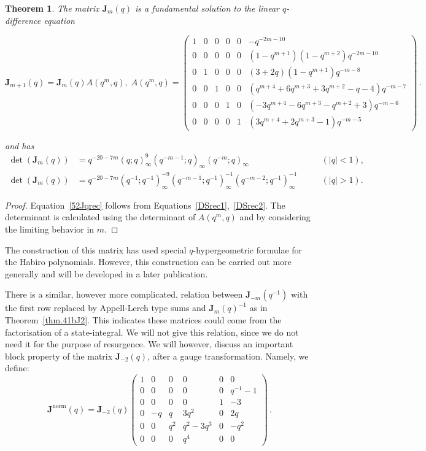 \documentclass[12pt,reqno]{amsart}
\newtheorem{theorem}{Theorem}
\theoremstyle{definition}
\def\be{\begin{equation}}
\def\ee{\end{equation}}
\def\bJ{\mathbf J}
\begin{document}
\begin{theorem}
\label{thm.51bJ1}
  The matrix $\bJ_{m}(q)$ is a fundamental solution to the linear $q$-difference
  equation
\begin{small}
\be
\label{52Jqrec}
\bJ_{m+1}(q) = \bJ_{m}(q) A(q^m,q),\; A(q^m,q)=
\begin{pmatrix}
    1 & 0 & 0 & 0 & 0 & -q^{-2m-10}\\
    0 & 0 & 0 & 0 & 0 & (1-q^{m+1})(1-q^{m+2})q^{-2m-10}\\
    0 & 1 & 0 & 0 & 0 & (3 + 2q)(1-q^{m+1})q^{-m-8}\\
    0 & 0 & 1 & 0 & 0 & (q^{m+4} + 6q^{m+3} + 3q^{m+2} - q - 4)q^{-m-7}\\
    0 & 0 & 0 & 1 & 0 & (-3q^{m+4} - 6q^{m+3} - q^{m+2} + 3)q^{-m-6}\\
    0 & 0 & 0 & 0 & 1 & (3q^{m+4} + 2q^{m+3} - 1)q^{-m-5}
  \end{pmatrix} \,.
\ee
\end{small}
and has
\be
\begin{aligned}
  \det(\bJ_{m}(q))
  &=q^{-20-7m}(q;q)_{\infty}^{9}(q^{-m-1};q)_{\infty}(q^{-m};q)_{\infty}
  &\qquad (|q|<1),\\
  \det(\bJ_{m}(q))
  &=
  q^{-20-7m}(q^{-1};q^{-1})_{\infty}^{-9}(q^{-m-1};q^{-1})_{\infty}^{-1}
  (q^{-m-2};q^{-1})_{\infty}^{-1}
  &\qquad (|q|>1).
\end{aligned}
\ee
\end{theorem}
\begin{proof}
  Equation~\eqref{52Jqrec} follows from Equations~\eqref{DSrec1},~\eqref{DSrec2}. The
  determinant is calculated using the determinant of $A(q^{m},q)$ and by considering
  the limiting behavior in $m$.
\end{proof}
The construction of this matrix has used special $q$-hypergeometric formulae for the
Habiro polynomials. However, this construction can be carried out more generally and
will be developed in a later publication. 

There is a similar, however more complicated, relation between
$\bJ_{-m}(q^{-1})$ with the first row replaced by Appell-Lerch type
sums and $\bJ_{m}(q)^{-1}$ as in Theorem~\ref{thm.41bJ2}. This
indicates these matrices could come from the factorisation of a
state-integral. We will not give this relation, since we do not need
it for the purpose of resurgence. We will however, discuss an
important block property of the matrix $\bJ_{-2}(q)$, after a gauge transformation.
Namely, we define:
\be
\label{J52norm}
\bJ^{\mathrm{norm}}(q)
=
\bJ_{-2}(q)
\begin{pmatrix}
1 & 0 & 0 & 0 & 0 & 0\\
0 & 0 & 0 & 0 & 0 & q^{-1}-1\\
0 & 0 & 0 & 0 & 1 & -3\\
0 & -q & q & 3q^2 & 0 & 2q\\
0 & 0 & q^2 & q^2-3q^3 & 0 & -q^2\\
0 & 0 & 0 & q^4 & 0 & 0
\end{pmatrix} \,.
\ee
\end{document}
